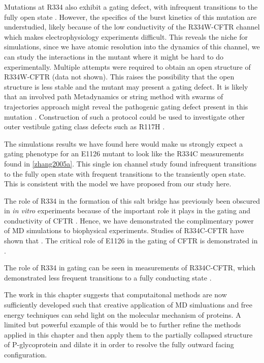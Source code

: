 Mutations at R334 also exhibit a gating defect, with infrequent transitions to the fully open state \cite{zhang2005a ,cui2013a, sheppard1993}. However, the specifics of the burst kinetics of this mutation are understudied, likely because of the low conductivity of the R334W-CFTR channel which makes electrophysiology experiments difficult. This reveals the niche for simulations, since we have atomic resolution into the dynamics of this channel, we can study the interactions in the mutant where it might be hard to do experimentally. Multiple attempts were required to obtain an open structure of R334W-CFTR (data not shown). This raises the possibility that the open structure is less stable and the mutant may present a gating defect. It is likely that an involved path Metadynamics or string method with swarms of trajectories approach might reveal the pathogenic gating defect present in this mutation \cite{lev2020, hoffmann2018, branduardi2007, }. Construction of such a protocol could be used to investigate other outer vestibule gating class defects such as R117H \cite{simon2021}.


The simulations results we have found here would make us strongly expect a gating phenotype for an E1126 mutant to look like the R334C measurements found in \ref{zhang2005a}. This single ion channel study found infrequent transitions to the fully open state with frequent transitions to the transiently open state. This is consistent with the model we have proposed from our study here.

The role of R334 in the formation of this salt bridge has previously been obscured in \textit{in vitro} experiments because of the important role it plays in the gating and conductivity of CFTR \cite{gong2003}. Hence, we have demonstrated the complimentary power of MD simulations to biophysical experiments. Studies of R334C-CFTR have shown that \cite{zhang2005, rahman2013}. The critical role of E1126 in the gating of CFTR is demonstrated in \cite{cui2014}.

The role of R334 in gating can be seen in measurements of R334C-CFTR, which demonstrated less frequent transitions to a fully conducting state \cite{zhang2005a}.

The work in this chapter suggests that computaitonal methods are now sufficiently developed such that creative application of MD simluations and free energy techniques can sehd light on the molecular mechanism of proteins. A limited but powerful example of this would be to further refine the methods applied in this chapter and then apply them to the partially collapsed structure of P-glycoprotein and dilate it in order to resolve the fully outward facing configuration.

